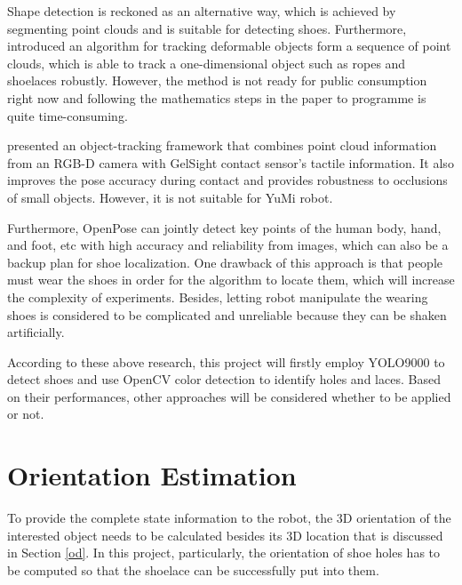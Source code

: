 Shape detection is reckoned as an alternative way, which is achieved by segmenting point clouds and is suitable for detecting shoes. Furthermore, \citep{deformable_track} introduced an algorithm for tracking deformable objects form a sequence of point clouds, which is able to track a one-dimensional object such as ropes and shoelaces robustly. However, the method is not ready for public consumption right now and following the mathematics steps in the paper to programme is quite time-consuming.

\citep{vision_touch} presented an object-tracking framework that combines point cloud information from an RGB-D camera with GelSight contact sensor's tactile information. It also improves the pose accuracy during contact and provides robustness to occlusions of small objects. However, it is not suitable for YuMi robot.

Furthermore, OpenPose \citep{openpose} can jointly detect key points of the human body, hand, and foot, etc with high accuracy and reliability from images, which can also be a backup plan for shoe localization. One drawback of this approach is that people must wear the shoes in order for the algorithm to locate them, which will increase the complexity of experiments. Besides, letting robot manipulate the wearing shoes is considered to be complicated and unreliable because they can be shaken artificially.

According to these above research, this project will firstly employ YOLO9000 to detect shoes and use OpenCV color detection to identify holes and laces. Based on their performances, other approaches will be considered whether to be applied or not.

\section{Orientation Estimation} \label{oriestimation}
To provide the complete state information to the robot, the 3D orientation of the interested object needs to be calculated besides its 3D location that is discussed in Section \ref{od}. In this project, particularly, the orientation of shoe holes has to be computed so that the shoelace can be successfully put into them.

